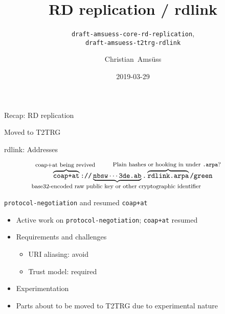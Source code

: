 \documentclass[aspectratio=169]{beamer}
\title{RD replication / rdlink}
\subtitle{\texttt{draft-amsuess-core-rd-replication},\\\texttt{draft-amsuess-t2trg-rdlink}}
\author{Christian~Amsüss}
\date{2019-03-29}
\begin{document}
\frame{\titlepage}

\begin{frame}{Recap: RD replication}\begin{center}
	{\small }
\end{center}\end{frame}

\begin{frame}{}\Large
	Moved to T2TRG
\end{frame}

\begin{frame}{rdlink: Addresses}\begin{center}
		\Large

		\[
		\overbrace{\texttt{coap+at}}^{\text{\hbox to 0cm{\hss \footnotesize coap+at being revived \hss}}}%
		\texttt{://}%
		\underbrace{\texttt{nbsw}\cdots{}\texttt{3de.ab}}_{\text{\hbox to 0cm{\hss \footnotesize base32-encoded raw public key or other cryptographic identifier \hss}}}%
		\texttt{.}
		\overbrace{\texttt{rdlink.arpa}}^{\text{\hbox to 0cm{\hss \footnotesize Plain hashes or hooking in under \texttt{.arpa}? \hss}}}%
		\texttt{/green}
		\]
\end{center}\end{frame}

\begin{frame}{\texttt{protocol-negotiation} and resumed \texttt{coap+at}}\Large
	\begin{itemize}
		\item Active work on \texttt{protocol-negotiation}; \texttt{coap+at} resumed
		\item Requirements and challenges\begin{itemize}\large
			\item URI aliasing: avoid
			\item Trust model: required
		\end{itemize}
		\item Experimentation
		\item Parts about to be moved to T2TRG due to experimental nature
	\end{itemize}
\end{frame}
\end{document}

